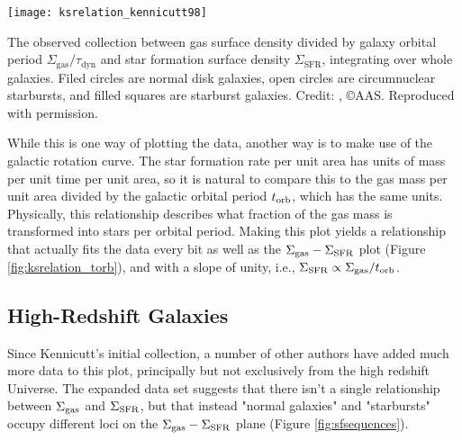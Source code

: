 \begin{marginfigure}
\texttt{[image: ksrelation\_kennicutt98]}
\caption[Whole-galaxy Kennicutt-Schmidt relation, including orbital time]{
\label{fig:ksrelation_torb}
The observed collection between gas surface density divided by galaxy orbital period $\Sigma_{\mathrm{gas}}/\tau_{\mathrm{dyn}}$ and star formation surface density $\Sigma_{\mathrm{SFR}}$, integrating over whole galaxies. Filed circles are normal disk galaxies, open circles are circumnuclear starbursts, and filled squares are starburst galaxies. Credit: \citet{kennicutt98a}, \copyright AAS. Reproduced with permission.
}
\end{marginfigure}

While this is one way of plotting the data, another way is to make use of the galactic rotation curve. The star formation rate per unit area has units of mass per unit time per unit area, so it is natural to compare this to the gas mass per unit area divided by the galactic orbital period $t_{\rm orb}$, which has the same units. Physically, this relationship describes what fraction of the gas mass is transformed into stars per orbital period. Making this plot yields a relationship that actually fits the data every bit as well as the $\Sigma_{\rm gas} - \Sigma_{\rm SFR}$ plot (Figure \ref{fig:ksrelation_torb}), and with a slope of unity, i.e., $\Sigma_{\rm SFR} \propto \Sigma_{\rm gas}/t_{\rm orb}$.

\subsection{High-Redshift Galaxies}

Since Kennicutt's initial collection, a number of other authors have added much more data to this plot, principally but not exclusively from the high redshift Universe. The expanded data set suggests that there isn't a single relationship between $\Sigma_{\rm gas}$ and $\Sigma_{\rm SFR}$, but that instead "normal galaxies" and "starbursts" occupy different loci on the $\Sigma_{\rm gas} - \Sigma_{\rm SFR}$ plane (Figure \ref{fig:sfsequences}).

